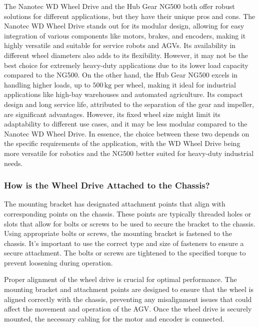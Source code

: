 \documentclass[../../main]{subfiles}
\begin{document}
The Nanotec WD Wheel Drive and the Hub Gear NG500 both offer robust solutions for different applications, but they have their unique pros and cons. The Nanotec WD Wheel Drive stands out for its modular design, allowing for easy integration of various components like motors, brakes, and encoders, making it highly versatile and suitable for service robots and AGVs. Its availability in different wheel diameters also adds to its flexibility. However, it may not be the best choice for extremely heavy-duty applications due to its lower load capacity compared to the NG500. On the other hand, the Hub Gear NG500 excels in handling higher loads, up to $500 \, \mathrm{kg}$ per wheel, making it ideal for industrial applications like high-bay warehouses and automated agriculture. Its compact design and long service life, attributed to the separation of the gear and impeller, are significant advantages. However, its fixed wheel size might limit its adaptability to different use cases, and it may be less modular compared to the Nanotec WD Wheel Drive. In essence, the choice between these two depends on the specific requirements of the application, with the WD Wheel Drive being more versatile for robotics and the NG500 better suited for heavy-duty industrial needs.

\subsubsection{How is the Wheel Drive Attached to the Chassis?}
The mounting bracket has designated attachment points that align with corresponding points on the chassis. These points are typically threaded holes or slots that allow for bolts or screws to be used to secure the bracket to the chassis. Using appropriate bolts or screws, the mounting bracket is fastened to the chassis. It's important to use the correct type and size of fasteners to ensure a secure attachment. The bolts or screws are tightened to the specified torque to prevent loosening during operation.

Proper alignment of the wheel drive is crucial for optimal performance. The mounting bracket and attachment points are designed to ensure that the wheel is aligned correctly with the chassis, preventing any misalignment issues that could affect the movement and operation of the AGV. Once the wheel drive is securely mounted, the necessary cabling for the motor and encoder is connected.
\end{document}
